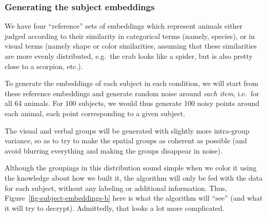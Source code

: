 \documentclass[
  authoryear]{elsarticle}
\begin{document}
\subsubsection{Generating the subject
embeddings}\label{generating-the-subject-embeddings}

We have four ``reference'' sets of embeddings which represent animals
either judged according to their similarity in categorical terms
(namely, species), or in visual terms (namely shape or color
similarities, assuming that these similarities are more evenly
distributed, e.g.~the crab looks like a spider, but is also pretty close
to a scorpion, etc.).

To generate the embeddings of each subject in each condition, we will
start from these reference embeddings and generate random noise around
\emph{each item}, i.e.~for all 64 animals. For 100 subjects, we would
thus generate 100 noisy points around each animal, each point
corresponding to a given subject.

The visual and verbal groups will be generated with slightly more
intra-group variance, so as to try to make the spatial groups as
coherent as possible (and avoid blurring everything and making the
groups disappear in noise).

Although the groupings in this distribution sound simple when we color
it using the knowledge about how we built it, the algorithm will only be
fed with the data for each subject, without any labeling or additional
information. Thus, Figure~\ref{fig-subject-embeddings-b} here is what
the algorithm will ``see'' (and what it will try to decrypt).
Admittedly, that looks a lot more complicated.
\end{document}
